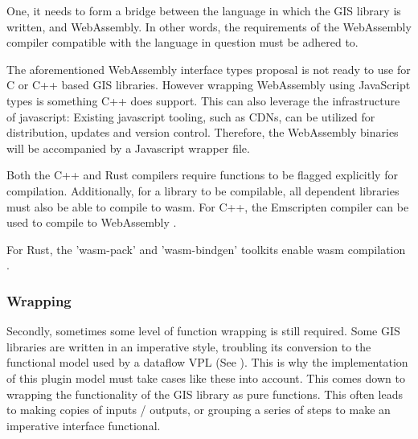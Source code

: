 One, it needs to form a bridge between the language in which the GIS library is written, and WebAssembly. 
In other words, the requirements of the WebAssembly compiler compatible with the language in question must be adhered to.
 
The aforementioned WebAssembly interface types proposal is not ready to use for C or C++ based GIS libraries.  
However wrapping WebAssembly using JavaScript types is something C++ does support. 
This can also leverage the infrastructure of javascript:
Existing javascript tooling, such as \ac{CDN}s, can be utilized for distribution, updates and version control.
Therefore, the WebAssembly binaries will be accompanied by a Javascript wrapper file.

Both the C++ and Rust compilers require functions to be flagged explicitly for compilation. 
Additionally, for a library to be compilable, all dependent libraries must also be able to compile to wasm.
For C++, the Emscripten compiler can be used to compile to WebAssembly \citep*{emscripten_organization_emscripten_2022}. 

For Rust, the 'wasm-pack' and 'wasm-bindgen' toolkits enable \ac{wasm} compilation \citep{contributors_wasm-bindgen_2022,contributors_wasm-pack_2022}.

\subsubsection{Wrapping}

Secondly, sometimes some level of function wrapping is still required. 
Some GIS libraries are written in an imperative style, troubling its conversion to the functional model used by a dataflow VPL (See ).
This is why the implementation of this plugin model must take cases like these into account. 
This comes down to wrapping the functionality of the GIS library as pure functions. 
This often leads to making copies of inputs / outputs, or grouping a series of steps to make an imperative interface functional.


